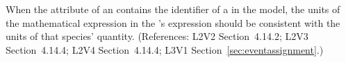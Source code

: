 When the  attribute of an \EventAssignment
contains the identifier of a \Species in the model, the
units of the mathematical expression in the
\EventAssignment's  expression should be
consistent with the units of that species' quantity.
(References: L2V2 Section~4.14.2; L2V3 Section~4.14.4; 
L2V4 Section~4.14.4; L3V1 Section~\ref{sec:eventassignment}.)
